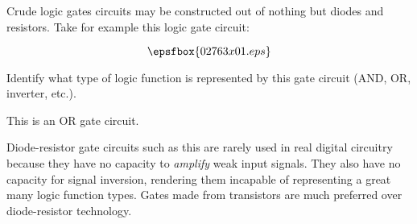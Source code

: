 

Crude logic gates circuits may be constructed out of nothing but diodes and resistors.  Take for example this logic gate circuit:

$$\epsfbox{02763x01.eps}$$

Identify what type of logic function is represented by this gate circuit (AND, OR, inverter, etc.).







This is an OR gate circuit.







Diode-resistor gate circuits such as this are rarely used in real digital circuitry because they have no capacity to {\it amplify} weak input signals.  They also have no capacity for signal inversion, rendering them incapable of representing a great many logic function types.  Gates made from transistors are much preferred over diode-resistor technology.




